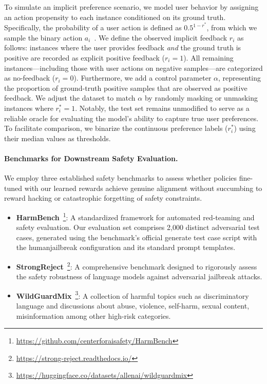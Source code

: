\documentclass[]{arxiv_singlecolumn}
\theoremstyle{plain}
\theoremstyle{definition}
\theoremstyle{remark}
\begin{document}
To simulate an implicit preference scenario, we model user behavior by assigning an action propensity to each instance conditioned on its ground truth. Specifically, the probability of a user action is defined as $0.5^{1-r^*}$, from which we sample the binary action $a_i$~\citep{wang2023nipsescfr,wang2025kddcfrpro}.
We define the observed implicit feedback $r_i$ as follows: instances where the user provides feedback \textit{and} the ground truth is positive are recorded as explicit positive feedback ($r_i=1$). All remaining instances—including those with user actions on negative samples—are categorized as no-feedback ($r_i=0$). Furthermore, we add a control parameter $\alpha$, representing the proportion of ground-truth positive samples that are observed as positive feedback. We adjust the dataset to match $\alpha$ by randomly masking or unmasking instances where $r^*_i=1$. Notably, the test set remains unmodified to serve as a reliable oracle for evaluating the model's ability to capture true user preferences. To facilitate comparison, we binarize the continuous preference labels ($r^*_i$) using their median values as thresholds. 
    
\paragraph{Benchmarks for Downstream Safety Evaluation.}
We employ three established safety benchmarks to assess whether policies fine-tuned with our learned rewards achieve genuine alignment without succumbing to reward hacking or catastrophic forgetting of safety constraints.

\begin{itemize}[leftmargin=*]
    \item \textbf{HarmBench}~\citep{HarmBench}\footnote{\url{https://github.com/centerforaisafety/HarmBench}}:  A standardized framework for automated red-teaming and safety evaluation. Our evaluation set comprises 2,000 distinct adversarial test cases, generated using the benchmark's official generate test case script with the humanjailbreak configuration and its standard prompt templates.
    \item \textbf{StrongReject}~\citep{StrongReject}\footnote{\url{https://strong-reject.readthedocs.io/}}: A comprehensive benchmark designed to rigorously assess the safety robustness of language models against adversarial jailbreak attacks. 
    \item \textbf{WildGuardMix}~\citep{Wildguard}\footnote{\url{https://huggingface.co/datasets/allenai/wildguardmix}}: A collection of harmful topics such as discriminatory language and discussions about abuse, violence, self-harm, sexual content, misinformation among other high-risk categories. 
\end{itemize}
\end{document}
